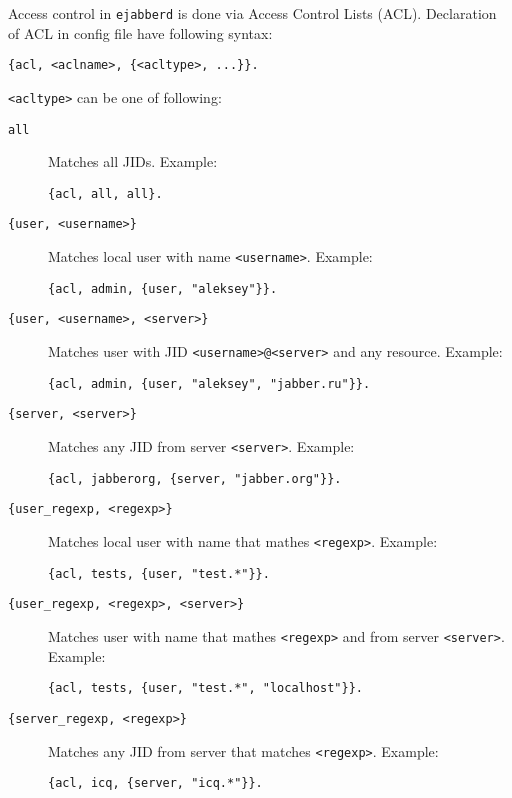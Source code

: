 \documentclass[10pt]{article}
\newcommand{\ejabberd}{\texttt{ejabberd}}
\begin{document}
Access control in \ejabberd{} is done via Access Control Lists (ACL).
Declaration of ACL in config file have following syntax:
\begin{verbatim}
{acl, <aclname>, {<acltype>, ...}}.
\end{verbatim}

\texttt{<acltype>} can be one of following:
\begin{description}
\item[\texttt{all}] Matches all JIDs.  Example:
\begin{verbatim}
{acl, all, all}.
\end{verbatim}

\item[\texttt{\{user, <username>\}}] Matches local user with name
  \texttt{<username>}.  Example:
\begin{verbatim}
{acl, admin, {user, "aleksey"}}.
\end{verbatim}

\item[\texttt{\{user, <username>, <server>\}}] Matches user with JID
  \texttt{<username>@<server>} and any resource.  Example:
\begin{verbatim}
{acl, admin, {user, "aleksey", "jabber.ru"}}.
\end{verbatim}

\item[\texttt{\{server, <server>\}}] Matches any JID from server
  \texttt{<server>}.  Example:
\begin{verbatim}
{acl, jabberorg, {server, "jabber.org"}}.
\end{verbatim}

\item[\texttt{\{user\_regexp, <regexp>\}}] Matches local user with name that
  mathes \texttt{<regexp>}.  Example:
\begin{verbatim}
{acl, tests, {user, "test.*"}}.
\end{verbatim}

\item[\texttt{\{user\_regexp, <regexp>, <server>\}}] Matches user with name
  that mathes \texttt{<regexp>} and from server \texttt{<server>}.  Example:
\begin{verbatim}
{acl, tests, {user, "test.*", "localhost"}}.
\end{verbatim}

\item[\texttt{\{server\_regexp, <regexp>\}}] Matches any JID from server that
  matches \texttt{<regexp>}.  Example:
\begin{verbatim}
{acl, icq, {server, "icq.*"}}.
\end{verbatim}


\end{description}
\end{document}
